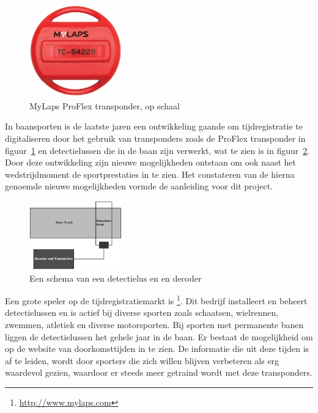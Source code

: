 \newcommand{\aanleiding}{}

\begin{figure}
  \begin{center}
    \includegraphics[width=4cm]{style/images/transponder}
  \end{center}
  \caption{MyLaps ProFlex transponder, op schaal}
  \label{fig:transponder}
  \vspace{15mm}
\end{figure}

In baansporten is de laatste jaren een ontwikkeling gaande om tijdregistratie te digitaliseren door het gebruik van transponders zoals de \mylaps ProFlex transponder in figuur~\ref{fig:transponder} en detectielussen die in de baan zijn verwerkt, wat te zien is in figuur~\ref{fig:detection-loop}. Door deze ontwikkeling zijn nieuwe mogelijkheden ontstaan om ook naast het wedstrijdmoment de sportprestaties in te zien. Het constateren van de hierna genoemde nieuwe mogelijkheden vormde de aanleiding voor dit project.

\begin{figure}
  \begin{center}
    \includegraphics[width=4cm]{style/images/DetectionLoop}
  \end{center}
  \caption{Een schema van een detectielus en en decoder}
  \label{fig:detection-loop}
  \vspace{5mm}
\end{figure}

Een grote speler op de tijdregistratiemarkt is \mylaps\footnote{\url{http://www.mylaps.com}}. Dit bedrijf installeert en beheert detectielussen en is actief bij diverse sporten zoals schaatsen, wielrennen, zwemmen, atletiek en diverse motorsporten. Bij sporten met permanente banen liggen de detectielussen het gehele jaar in de baan. Er bestaat de mogelijkheid om op de website van \mylaps doorkomsttijden in te zien. De informatie die uit deze tijden is af te leiden, wordt door sporters die zich willen blijven verbeteren als erg waardevol gezien, waardoor er steeds meer getraind wordt met deze transponders.

